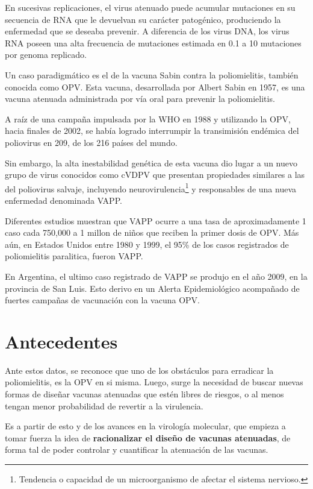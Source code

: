 En sucesivas replicaciones, el virus atenuado puede acumular mutaciones en su
secuencia de \ac{RNA} que le devuelvan su car\'acter patog\'enico, produciendo
la enfermedad que se deseaba prevenir. A diferencia de los virus \ac{DNA}, los
virus \ac{RNA} poseen una alta frecuencia de mutaciones estimada en 0.1 a 10
mutaciones por genoma replicado\cite{Vignuzzi08}.

Un caso paradigm\'atico es el de la vacuna Sabin contra la poliomielitis,
tambi\'en conocida como \ac{OPV}. Esta vacuna, desarrollada por Albert Sabin en
1957, es una vacuna atenuada administrada por v\'ia oral para prevenir la
poliomielitis. 

A ra\'iz de una campa\~na impulsada por la \ac{WHO} en 1988 y utilizando la
\ac{OPV}, hacia finales de 2002, se hab\'ia logrado interrumpir la
transimisi\'on end\'emica del poliovirus en 209, de los 216 pa\'ises del
mundo\cite{Aylward04}. 

Sin embargo, la alta inestabilidad gen\'etica de esta vacuna dio lugar a
un nuevo grupo de virus conocidos como \ac{cVDPV} que presentan propiedades
similares a las del poliovirus salvaje, incluyendo
neurovirulencia\footnote{Tendencia o capacidad de un microorganismo de afectar
el sistema nervioso.} y responsables de una nueva enfermedad denominada
\ac{VAPP}. 

Diferentes estudios muestran que \ac{VAPP} ocurre a una tasa de
aproximadamente 1 caso cada 750,000 a 1 millon de ni\~nos que reciben la
primer dosis de \ac{OPV}\cite{Aylward04}. M\'as a\'un, en Estados Unidos entre
1980 y 1999, el 95\% de los casos registrados de poliomielitis paralitica,
fueron \ac{VAPP}\cite{DeJesus07}.

En Argentina, el ultimo caso registrado de \ac{VAPP} se produjo en el a\~no
2009, en la provincia de San Luis\cite{msal09}. Esto derivo en un Alerta
Epidemiol\'ogico acompa\~nado de fuertes campa\~nas de vacunaci\'on con la
vacuna \ac{OPV}.

\section{Antecedentes}
\label{antecedentes}
Ante estos datos, se reconoce que uno de los obst\'aculos para erradicar la
poliomielitis, es la \ac{OPV} en si misma\cite{Chumakov08}. Luego, surge la
necesidad de buscar nuevas formas de dise\~nar vacunas atenuadas que est\'en
libres de riesgos, o al menos tengan menor probabilidad de revertir a la
virulencia.

Es a partir de esto y de los avances en la virolog\'ia molecular, que empieza
a tomar fuerza la idea de \textbf{racionalizar el dise\~no de vacunas
atenuadas}, de forma tal de poder controlar y cuantificar la atenuaci\'on de las
vacunas\cite{Lauring10}.

